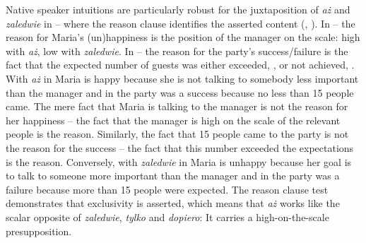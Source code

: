 \documentclass[output=paper,colorlinks,citecolor=brown]{langscibook}
\begin{document}
\ea\label{ex:tom:63}
\begin{xlist}
\end{xlist}
\z 

\noindent Native speaker intuitions are particularly robust for the juxtaposition of \textit{aż} and \textit{zaledwie} in -- where the reason clause identifies the asserted content (\citealt{dretske72}, \citealt{beaverclark08}). In -- the reason for Maria’s (un)hap\-pi\-ness is the position of the manager on the scale: high with \textit{aż}, low with \textit{zaledwie}. In -- the reason for the party’s success/failure is the fact that the expected number of guests was either exceeded, , or not achieved, . With \textit{aż} in  Maria is happy because she is not talking to somebody less important than the manager and in  the party was a success because no less than 15 people came. The mere fact that Maria is talking to the manager is not the reason for her happiness -- the fact that the manager is high on the scale of the relevant people is the reason. Similarly, the fact that 15 people came to the party is not the reason for the success -- the fact that this number exceeded the expectations is the reason. Conversely, with \textit{zaledwie} in  Maria is unhappy because her goal is to talk to someone more important than the manager and in  the party was a failure because more than 15 people were expected. The reason clause test demonstrates that exclusivity is asserted, which means that \textit{aż} works like the scalar opposite of \textit{zaledwie}, \textit{tylko}  and \textit{dopiero}: It carries a high-on-the-scale presupposition.
\end{document}
